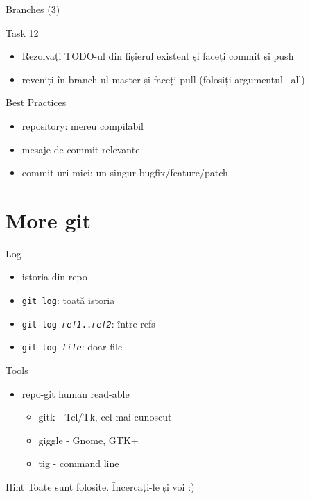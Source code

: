 \documentclass{beamer}
\begin{document}

\begin{frame}{Branches (3)}
  \begin{alertblock}{Task 12}
    \begin{itemize}
      \item Rezolvați TODO-ul din fișierul existent și faceți commit și push
      \item reveniți în branch-ul master și faceți pull (folosiți argumentul
      --all)
    \end{itemize}
  \end{alertblock}
\end{frame}

\begin{frame}{Best Practices}
  \begin{itemize}
    \item repository: mereu compilabil
    \item mesaje de commit relevante
    \item commit-uri mici: un singur bugfix/feature/patch
  \end{itemize}
\end{frame}

\section{More git}

\begin{frame}{Log}
  \begin{itemize}
    \item istoria din repo
    \item \texttt{git log}: toată istoria
    \item \texttt{git log \textit{ref1}..\textit{ref2}}: între refs
    \item \texttt{git log \textit{file}}: doar file
  \end{itemize}
\end{frame}

\begin{frame}{Tools}
  \begin{itemize}
    \item repo-git human read-able
    \begin{itemize}
      \item gitk - Tcl/Tk, cel mai cunoscut
      \item giggle - Gnome, GTK+
      \item tig - command line
    \end{itemize}
  \end{itemize}
  \begin{alertblock}{Hint}
    Toate sunt folosite. Încercați-le și voi :)
  \end{alertblock}
\end{frame}
\end{document}
